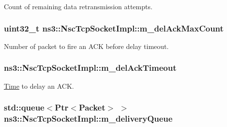 Count of remaining data retransmission attempts. 

\subsubsection[{\texorpdfstring{m\+\_\+del\+Ack\+Max\+Count}{m_delAckMaxCount}}]{\setlength{\rightskip}{0pt plus 5cm}uint32\+\_\+t ns3\+::\+Nsc\+Tcp\+Socket\+Impl\+::m\+\_\+del\+Ack\+Max\+Count\hspace{0.3cm}{\ttfamily [private]}}\hypertarget{classns3_1_1NscTcpSocketImpl_a6d64d9077fdc95726a129e8a89352e1d}{}\label{classns3_1_1NscTcpSocketImpl_a6d64d9077fdc95726a129e8a89352e1d}


Number of packet to fire an A\+CK before delay timeout. 

\subsubsection[{\texorpdfstring{m\+\_\+del\+Ack\+Timeout}{m_delAckTimeout}}]{ ns3\+::\+Nsc\+Tcp\+Socket\+Impl\+::m\+\_\+del\+Ack\+Timeout\hspace{0.3cm}{\ttfamily [private]}}\hypertarget{classns3_1_1NscTcpSocketImpl_a9e76d3ac3e18feb169d4538732bb86a5}{}\label{classns3_1_1NscTcpSocketImpl_a9e76d3ac3e18feb169d4538732bb86a5}


\hyperlink{classns3_1_1Time}{Time} to delay an A\+CK. 

\subsubsection[{\texorpdfstring{m\+\_\+delivery\+Queue}{m_deliveryQueue}}]{\setlength{\rightskip}{0pt plus 5cm}std\+::queue$<${\bf Ptr}$<${\bf Packet}$>$ $>$ ns3\+::\+Nsc\+Tcp\+Socket\+Impl\+::m\+\_\+delivery\+Queue\hspace{0.3cm}{\ttfamily [private]}}\hypertarget{classns3_1_1NscTcpSocketImpl_a51a043d0ac1976806daddd23360a8eb8}{}\label{classns3_1_1NscTcpSocketImpl_a51a043d0ac1976806daddd23360a8eb8}


